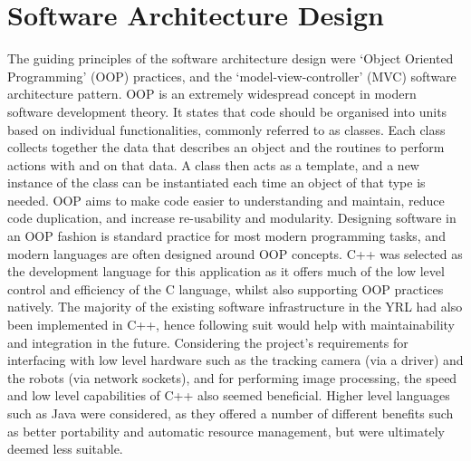 \section{Software Architecture Design} \label{SoftwareArchitectureDesign}
The guiding principles of the software architecture design were `Object Oriented Programming' (OOP) practices, and the `model-view-controller' (MVC) software architecture pattern. OOP \cite{OOP} is an extremely widespread concept in modern software development theory. It states that code should be organised into units based on individual functionalities, commonly referred to as classes. Each class collects together the data that describes an object and the routines to perform actions with and on that data. A class then acts as a template, and a new instance of the class can be instantiated each time an object of that type is needed. OOP aims to make code easier to understanding and maintain, reduce code duplication, and increase re-usability and modularity. Designing software in an OOP fashion is standard practice for most modern programming tasks, and modern languages are often designed around OOP concepts. C++ was selected as the development language for this application as it offers much of the low level control and efficiency of the C language, whilst also supporting OOP practices natively. The majority of the existing software infrastructure in the YRL had also been implemented in C++, hence following suit would help with maintainability and integration in the future. Considering the project's requirements for interfacing with low level hardware such as the tracking camera (via a driver) and the robots (via network sockets), and for performing image processing, the speed and low level capabilities of C++ also seemed beneficial. Higher level languages such as Java were considered, as they offered a number of different benefits such as better portability and automatic resource management, but were ultimately deemed less suitable.


